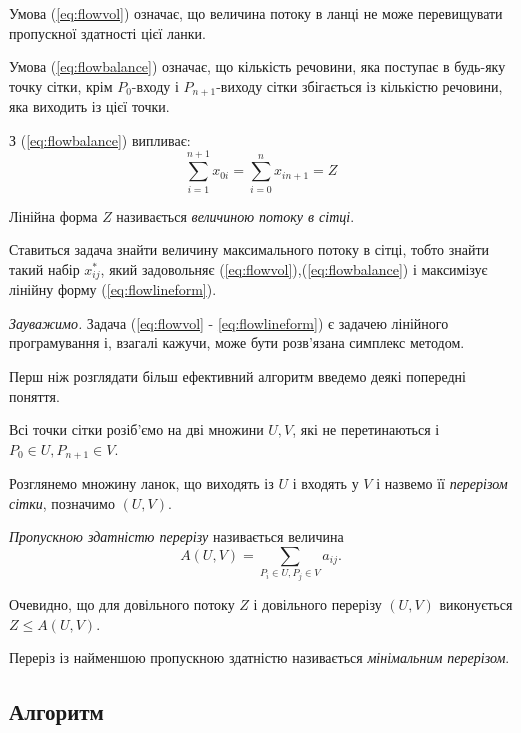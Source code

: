 \documentclass[12pt,a4paper]{book}
\begin{document}
Умова (\ref{eq:flowvol}) означає, що величина потоку в ланці не може перевищувати пропускної здатності цієї ланки.

Умова (\ref{eq:flowbalance}) означає, що кількість речовини, яка поступає в будь-яку точку сітки, крім $P_0$-входу і $P_{n+1}$-виходу сітки збігається із кількістю речовини, яка виходить із цієї точки.

З (\ref{eq:flowbalance}) випливає:
\begin{equation} \sum_{i=1}^{n+1} x_{0 i} = \sum_{i=0}^{n} x_{i n+1} = Z \label{eq:flowlineform} \end{equation}

Лінійна форма $Z$ називається \emph{величиною потоку в сітці}.

Ставиться задача знайти величину максимального потоку в сітці, тобто знайти такий набір $x_{ij}^*$, який задовольняє (\ref{eq:flowvol}),(\ref{eq:flowbalance}) і максимізує лінійну форму (\ref{eq:flowlineform}).

{\it Зауважимо.} Задача (\ref{eq:flowvol} - \ref{eq:flowlineform}) є задачею лінійного програмування і, взагалі кажучи, може бути розв’язана симплекс методом.

Перш ніж розглядати більш ефективний алгоритм введемо деякі попередні поняття.

Всі точки сітки розіб’ємо на дві множини $U, V$, які не перетинаються і $P_0 \in U, P_{n+1} \in V$.

Розглянемо множину ланок, що виходять із $U$ і входять у $V$ і назвемо її \emph{перерізом сітки}, позначимо $(U, V)$.

\emph{Пропускною здатністю перерізу} називається величина
\begin{equation} A(U, V) = \sum_{P_i \in U, P_j \in V} a_{ij}. \end{equation}

Очевидно, що для довільного потоку $Z$ і довільного перерізу $(U, V)$ виконується $Z \leq A(U, V)$.

Переріз із найменшою пропускною здатністю називається \emph{мінімальним перерізом}.

\subsection{Алгоритм}
\end{document}
